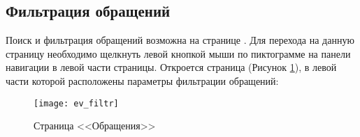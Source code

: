 \subsection{Фильтрация обращений} \label{ev_obr_filtr}

Поиск и фильтрация обращений возможна на странице . Для перехода на данную страницу  необходимо щелкнуть левой кнопкой мыши по пиктограмме  на панели навигации в левой части страницы. Откроется страница (Рисунок \ref{img_ev_filtr}), в левой части которой расположены параметры фильтрации обращений: 

\begin{figure}[ht]\centering
   \texttt{[image: ev\_filtr]}
   \caption{Страница <<Обращения>>}
   \label{img_ev_filtr}
 \end{figure}
 
